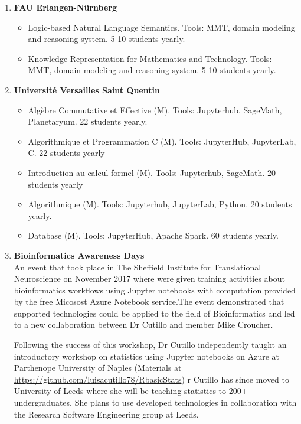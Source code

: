 \begin{enumerate}
\item \textbf{FAU Erlangen-Nürnberg}
  \begin{itemize}
  \item Logic-based Natural Language Semantics. Tools: MMT, domain
    modeling and reasoning system. 5-10 students yearly.
  \item Knowledge Representation for Mathematics and Technology.
    Tools: MMT, domain modeling and reasoning system.
    5-10 students yearly.
 \end{itemize}

\item \textbf{Université Versailles Saint Quentin}
  \begin{itemize}
  \item Algèbre Commutative et Effective (M). Tools: Jupyterhub,
    SageMath, Planetaryum. 22 students yearly.
  \item Algorithmique et Programmation C (M). Tools: JupyterHub,
    JupyterLab, C. 22 students yearly
  \item Introduction au calcul formel (M). Tools: Jupyterhub,
    SageMath. 20 students yearly
  \item Algorithmique (M). Tools: Jupyterhub, JupyterLab, Python. 20
    students yearly.
  \item Database (M). Tools: JupyterHub, Apache Spark. 60 students yearly.
 \end{itemize}

\item \textbf{ Bioinformatics Awareness Days}\\
An event that took place in The Sheffield Institute for Translational Neuroscience on November 2017 where were given training activities
about bioinformatics workflows using Jupyter notebooks with computation provided by the free Micosost Azure Notebook service.The event
demonstrated that \ODK supported technologies could be applied to the field of Bioinformatics and led to a new collaboration between Dr
Cutillo and \ODK member Mike Croucher.

Following the success of this workshop, Dr Cutillo independently taught an introductory workshop on statistics using Jupyter notebooks
on Azure at Parthenope University of Naples (Materials at \url{https://github.com/luisacutillo78/RbasicStats}) r Cutillo has since moved
to University of Leeds where she will be teaching statistics to 200+ undergraduates. She plans to use \ODK developed technologies
in collaboration with the Research Software Engineering group at Leeds.


\end{enumerate}
